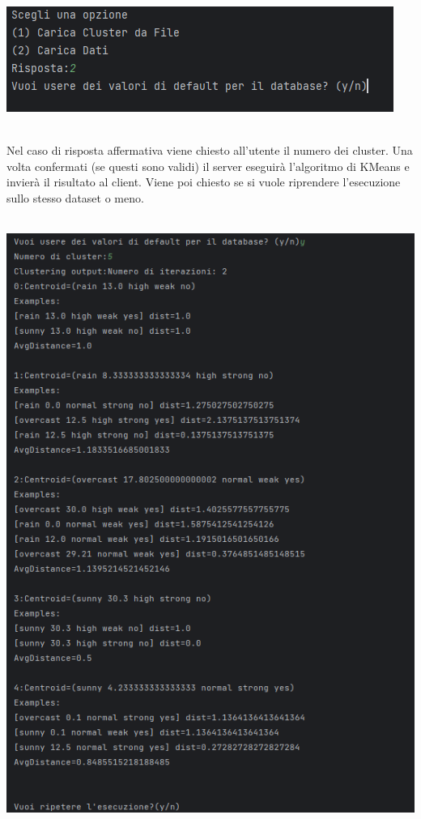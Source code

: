 \begin{enumerate}
\begin{itemize}[label=-]
\begin{itemize}[label=-]
\begin{minipage}[t]{0.3\textwidth}
        \includegraphics[scale=0.8]{img/test9.png}
      \end{minipage}
      \\ Nel caso di risposta affermativa viene chiesto all'utente il numero dei cluster. Una volta confermati (se questi sono validi) il server eseguirà l'algoritmo di KMeans e invierà il risultato al client. Viene poi chiesto se si vuole riprendere l'esecuzione sullo stesso dataset o meno. \\ \\
      \begin{minipage}[t]{0.3\textwidth}
        \includegraphics[scale=0.8]{img/test10.png}

\end{minipage}
\end{itemize}
\end{itemize}
\end{enumerate}
